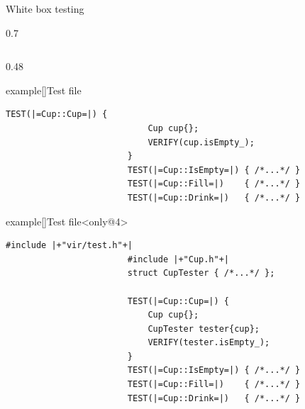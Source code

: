 \begin{frame}[fragile]{White box testing}
\begin{overlayarea}{\textwidth}{0.7\textheight}
\begin{columns}[T]
\begin{column}{0.48\textwidth}
\begin{varblock}{example}[\textwidth]{Test file}
\begin{lstlisting}[style=MyCpp]
                        TEST(|=Cup::Cup=|) {
                            Cup cup{};
                            VERIFY(cup.isEmpty_);
                        }
                        TEST(|=Cup::IsEmpty=|) { /*...*/ }
                        TEST(|=Cup::Fill=|)    { /*...*/ }
                        TEST(|=Cup::Drink=|)   { /*...*/ }
                    \end{lstlisting}
                \end{varblock}
                \begin{varblock}{example}[\textwidth]{Test file}<only@4>
                    \begin{lstlisting}[style=MyCpp]
                        #include |+"vir/test.h"+|
                        #include |+"Cup.h"+|
                        struct CupTester { /*...*/ };

                        TEST(|=Cup::Cup=|) {
                            Cup cup{};
                            CupTester tester{cup};
                            VERIFY(tester.isEmpty_);
                        }
                        TEST(|=Cup::IsEmpty=|) { /*...*/ }
                        TEST(|=Cup::Fill=|)    { /*...*/ }
                        TEST(|=Cup::Drink=|)   { /*...*/ }
                    \end{lstlisting}
                \end{varblock}
                \centering\vspace{-3mm}
            \end{column}
        \end{columns}
    \end{overlayarea}
\end{frame}
